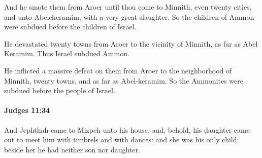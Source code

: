 			\begin{versebox}
					\item[BHS] 
					\item[ASV] And he smote them from Aroer until thou come to Minnith, even twenty cities, and unto Abelcheramim, with a very great slaughter. So the children of Ammon were subdued before the children of Israel.
					\item[NIV] He devastated twenty towns from Aroer to the vicinity of Minnith, as far as Abel Keramim. Thus Israel subdued Ammon.
					\item[NRSV] He inflicted a massive defeat on them from Aroer to the neighborhood of Minnith, twenty towns, and as far as Abel-keramim. So the Ammonites were subdued before the people of Israel.
			\end{versebox}

		\paragraph{Judges 11:34} %
			\label{JUDGES-11-34}

			And Jephthah came to Mizpeh unto his house, and, behold, his daughter came out to meet him with timbrels and with dances: and she was his only child; beside her he had neither son nor daughter.

